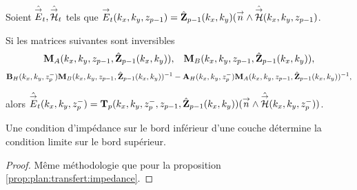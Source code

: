     \begin{prop}%
      \label{prop:plan:relevement:impedance}

      Soient \(\hat{{\overset{\rightarrow}{E}}}_t,\hat{{\overset{\rightarrow}{\mathcal{H}}}}_t\) tels que \({\overset{\rightarrow}{E}}_t(k_x,k_y,z_{p-1}) = \hat{\mathbf{Z}}_{p-1}(k_x,k_y)({\overset{\rightarrow}{n}} \wedge \hat{{\overset{\rightarrow}{\mathcal{H}}}}(k_x,k_y,z_{p-1})\).

      Si les matrices suivantes sont inversibles
      \begin{align*}
        \mathbf{M}_{A}(k_x,k_y,z_{p-1},\hat{\mathbf{Z}}_{p-1}(k_x,k_y)), && \mathbf{M}_{B}(k_x,k_y,z_{p-1},\hat{\mathbf{Z}}_{p-1}(k_x,k_y)),
      \end{align*}
      \begin{align*}
        \mathbf{B}_{H}(k_x,k_y,z_p^-)\mathbf{M}_{B}(k_x,k_y,z_{p-1},\hat{\mathbf{Z}}_{p-1}(k_x,k_y))^{-1} - \mathbf{A}_{H}(k_x,k_y,z_p^-)\mathbf{M}_{A}(k_x,k_y,z_{p-1},\hat{\mathbf{Z}}_{p-1}(k_x,k_y))^{-1},
      \end{align*}

      alors \(\hat{{\overset{\rightarrow}{E}}}_t(k_x,k_y,z_p^-) = \mathbf{T}_p(k_x,k_y,z_p^-,z_{p-1},\hat{\mathbf{Z}}_{p-1}(k_x,k_y))({\overset{\rightarrow}{n}} \wedge \hat{{\overset{\rightarrow}{\mathcal{H}}}}(k_x,k_y,z_p^-))\).

      Une condition d'impédance sur le bord inférieur d'une couche détermine la condition limite sur le bord supérieur.
    \end{prop}

    \begin{proof}
      Même méthodologie que pour la proposition \ref{prop:plan:transfert:impedance}.
    \end{proof}


